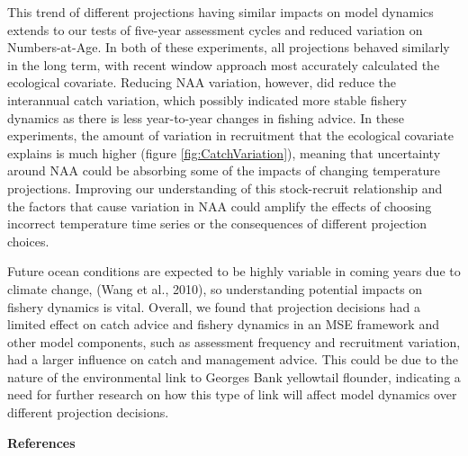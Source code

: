 \documentclass[
  12pt,
]{article}
\begin{document}
This trend of different projections having similar impacts on model dynamics extends to our tests of five-year assessment cycles and reduced variation on Numbers-at-Age. In both of these experiments, all projections behaved similarly in the long term, with recent window approach most accurately calculated the ecological covariate. Reducing NAA variation, however, did reduce the interannual catch variation, which possibly indicated more stable fishery dynamics as there is less year-to-year changes in fishing advice. In these experiments, the amount of variation in recruitment that the ecological covariate explains is much higher (figure \ref{fig:CatchVariation}), meaning that uncertainty around NAA could be absorbing some of the impacts of changing temperature projections. Improving our understanding of this stock-recruit relationship and the factors that cause variation in NAA could amplify the effects of choosing incorrect temperature time series or the consequences of different projection choices.

Future ocean conditions are expected to be highly variable in coming years due to climate change, (Wang et al., 2010), so understanding potential impacts on fishery dynamics is vital. Overall, we found that projection decisions had a limited effect on catch advice and fishery dynamics in an MSE framework and other model components, such as assessment frequency and recruitment variation, had a larger influence on catch and management advice. This could be due to the nature of the environmental link to Georges Bank yellowtail flounder, indicating a need for further research on how this type of link will affect model dynamics over different projection decisions.

\newpage

\textbf{References}
\end{document}
